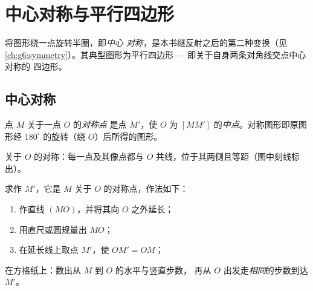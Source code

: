 \chapter{中心对称与平行四边形}\label{ch:g7:central}

将图形绕一点旋转半圈，即\emph{中心
对称}，是本书继反射之后的第二种变换（见
\cref{ch:g6:symmetry}）。其典型图形为平行四边形 ---
即关于自身两条对角线交点中心对称的
四边形。

\section{中心对称}

\begin{definition}[关于一点的对称]\label{def:g7:central:def}
点 $M$ 关于一点 $O$ 的\emph{对称点}
是点 $M'$，使 $O$ 为
$[MM']$ 的\emph{中点}。对称图形即原图形经
$180^\circ$ 的旋转（绕 $O$）后所得的图形。
\end{definition}

\begin{omfigure}

{\small 关于 $O$ 的对称：每一点及其像点都与
$O$ 共线，位于其两侧且等距（图中刻线标出）。}
\end{omfigure}

\begin{method}[作一点的对称点]\label{met:g7:central:construct}
求作 $M'$，它是 $M$ 关于 $O$ 的对称点，作法如下：
\begin{enumerate}
  \item 作直线 $(MO)$，并将其向 $O$ 之外延长；
  \item 用直尺或圆规量出 $MO$；
  \item 在延长线上取点 $M'$，使 $OM' = OM$；
\end{enumerate}
在方格纸上：数出从 $M$ 到 $O$ 的水平与竖直步数，
再从 $O$ 出发走\emph{相同}的步数到达 $M'$。
\end{method}


